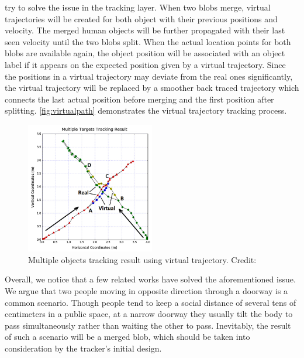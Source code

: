 \citeauthor{virtualtrack} \cite{virtualtrack} try to solve the issue in the tracking layer. When two blobs merge, virtual trajectories will be created for both object with their previous positions and velocity. The merged human objects will be further propagated with their last seen velocity until the two blobs split. When the actual location points for both blobs are available again, the object position will be associated with an object label if it appears on the expected position given by a virtual trajectory. Since the positions in a virtual trajectory may deviate from the real ones significantly, the virtual trajectory will be replaced by a smoother back traced trajectory which connects the last actual position before merging and the first position after splitting. \autoref{fig:virtualpath} demonstrates the virtual trajectory tracking process.
\begin{figure}
  \centering
  \includegraphics[width=0.5\textwidth]{figures/virtualpath.PNG}
  \caption{Multiple objects tracking result using virtual trajectory. Credit: \cite{virtualtrack}}\label{fig:virtualpath}
\end{figure}

Overall, we notice that a few related works have solved the aforementioned issue. We argue that two people moving in opposite direction through a doorway is a common scenario. Though people tend to keep a social distance of several tens of centimeters in a public space, at a narrow doorway they usually tilt the body to pass simultaneously rather than waiting the other to pass. Inevitably, the result of such a scenario will be a merged blob, which should be taken into consideration by the tracker's initial design.





